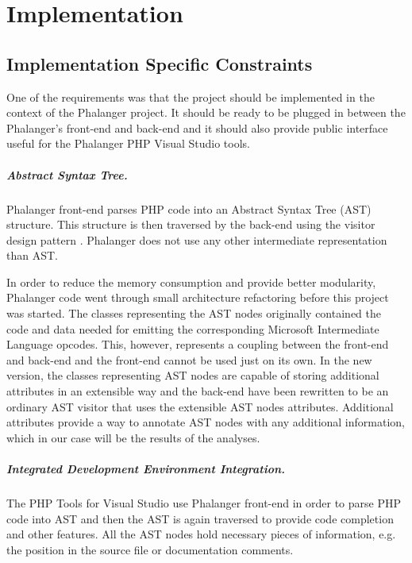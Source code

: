 \chapter{Implementation}

    \section{Implementation Specific Constraints}
    
    One of the requirements was that the project should be implemented 
    in the context of the Phalanger project. It should be ready 
    to be plugged in between the Phalanger's front-end and back-end and 
    it should also provide public interface useful for the 
    Phalanger PHP Visual Studio tools.
    
    \paragraph{Abstract Syntax Tree.} Phalanger front-end parses PHP code 
    into an Abstract Syntax Tree (AST) \cite{aho1985compilers} structure. 
    This structure is then traversed by the back-end using the 
    visitor design pattern \cite{gamma1994design}. Phalanger does not 
    use any other intermediate representation than AST.
    
    In order to reduce the memory consumption and provide better 
    modularity, Phalanger code went through small architecture 
    refactoring before this project was started.     
    The classes representing the AST nodes originally contained 
    the code and data needed for emitting the corresponding 
    Microsoft Intermediate Language opcodes. This, however, represents 
    a coupling between the front-end and back-end and the 
    front-end cannot be used just on its own. In the new 
    version, the classes representing AST nodes are capable 
    of storing additional attributes in an extensible way 
    and the back-end have been rewritten to be an ordinary AST 
    visitor that uses the extensible AST nodes attributes.
    Additional attributes provide a way to annotate AST nodes 
    with any additional information, which in our case will be 
    the results of the analyses.    
    
    \paragraph{Integrated Development Environment Integration.}
    The PHP Tools for Visual Studio use Phalanger front-end in order to 
    parse PHP code into AST and then the AST is again traversed to provide 
    code completion and other features. All the AST nodes hold necessary 
    pieces of information, e.g. the position in the source file or 
    documentation comments.
    
